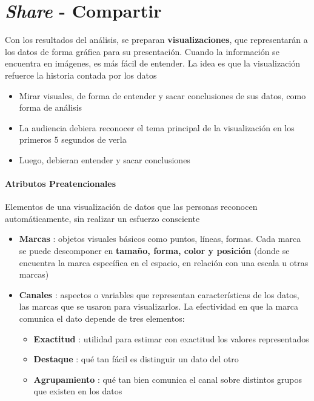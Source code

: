 
\section{\textit{Share} - Compartir}
Con los resultados del análisis, se preparan \textbf{visualizaciones}, que representarán a los datos de forma gráfica para su presentación. Cuando la información se encuentra en imágenes, es más fácil de entender. La idea es que la visualización refuerce la historia contada por los datos
\begin{itemize}
    \item {Mirar visuales, de forma de entender y sacar conclusiones de sus datos, como forma de análisis}
    \item {La audiencia debiera reconocer el tema principal de la visualización en los primeros 5 segundos de verla}
    \item {Luego, debieran entender y sacar conclusiones}
\end{itemize}

\paragraph{Atributos Preatencionales}
Elementos de una visualización de datos que las personas reconocen automáticamente, sin realizar un esfuerzo consciente
\begin{itemize}
    \item {\textbf{Marcas} : objetos visuales básicos como puntos, líneas, formas. Cada marca se puede descomponer en \textbf{tamaño, forma, color y posición} (donde se encuentra la marca específica en el espacio, en relación con una escala u otras marcas)}
    \item {\textbf{Canales} : aspectos o variables que representan características de los datos, las marcas que se usaron para visualizarlos. La efectividad en que la marca comunica el dato depende de tres elementos:
    \begin{itemize}
        \item {\textbf{Exactitud} : utilidad para estimar con exactitud los valores representados}
        \item {\textbf{Destaque} : qué tan fácil es distinguir un dato del otro}
        \item {\textbf{Agrupamiento} : qué tan bien comunica el canal sobre distintos grupos que existen en los datos}
    \end{itemize}}
\end{itemize}

